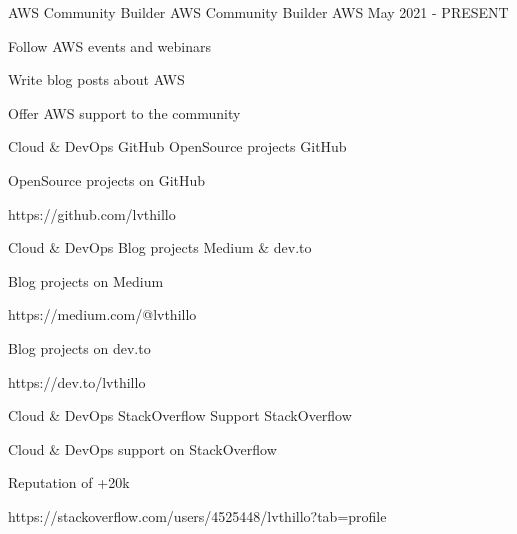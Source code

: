 

\begin{cventries}

  \cventry
    {AWS Community Builder} %
    {AWS Community Builder} %
    {AWS} %
    {May 2021 - PRESENT} %
    {
      \begin{cvitems} %
        \item {Follow AWS events and webinars}
        \item {Write blog posts about AWS}
        \item {Offer AWS support to the community}
      \end{cvitems}
    }

  \cventry
    {Cloud \& DevOps} %
    {GitHub OpenSource projects} %
    {GitHub} %
    {} %
    {
      \begin{cvitems} %
        \item {OpenSource projects on GitHub}
        \item {https://github.com/lvthillo}
      \end{cvitems}
    }

  \cventry
    {Cloud \& DevOps} %
    {Blog projects} %
    {Medium \& dev.to} %
    {} %
    {
      \begin{cvitems} %
        \item {Blog projects on Medium}
        \item {https://medium.com/@lvthillo}
        \item {Blog projects on dev.to}
        \item {https://dev.to/lvthillo}
      \end{cvitems}
    }

  \cventry
    {Cloud \& DevOps} %
    {StackOverflow Support} %
    {StackOverflow} %
    {} %
    {
      \begin{cvitems} %
        \item {Cloud \& DevOps support on StackOverflow}
        \item {Reputation of +20k}
        \item {https://stackoverflow.com/users/4525448/lvthillo?tab=profile}
      \end{cvitems}
    }


\end{cventries}
